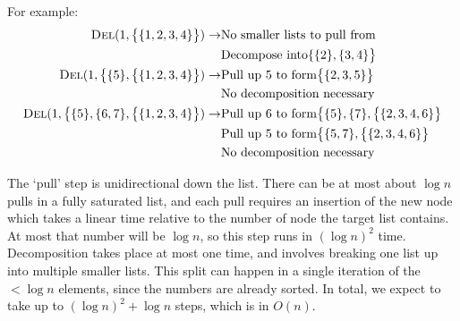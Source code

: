 \documentclass{article}
\begin{document}
\begin{enumerate}
\begin{enumerate}
         For example:
            \begin{equation*}
            \begin{aligned}
                \textsc{Del}(1, \big\{\{1, 2, 3, 4\}\big\}) \rightarrow
                    & \text{No smaller lists to pull from} \\
                    & \text{Decompose into} \{\{2\}, \{3, 4\}\big\} \\
                \textsc{Del}(1, \big\{\{5\}, \big\{\{1, 2, 3, 4\}\big\}) \rightarrow
                    & \text{Pull up 5 to form} \big\{\{2, 3, 5\}\big\} \\
                    & \text{No decomposition necessary} \\
                \textsc{Del}(1, \big\{\{5\}, \{6, 7\}, \big\{\{1, 2, 3, 4\}\big\}) \rightarrow
                    & \text{Pull up 6 to form} \big\{\{5\}, \{7\}, \big\{\{2, 3, 4, 6\}\big\} \\
                    & \text{Pull up 5 to form} \big\{\{5, 7\}, \big\{\{2, 3, 4, 6\}\big\} \\
                    & \text{No decomposition necessary}
            \end{aligned}
            \end{equation*}

        The `pull' step is unidirectional down the list. There can be at most about $\log n$ pulls in a fully saturated list, and each pull requires an insertion of the new node which takes a linear time relative to the number of node the target list contains. At most that number will be $\log n$, so this step runs in $(\log n)^2$ time. Decomposition takes place at most one time, and involves breaking one list up into multiple smaller lists. This split can happen in a single iteration of the $< \log n$ elements, since the numbers are already sorted. In total, we expect to take up to $(\log n)^2 + \log n$ steps, which is in $O(n)$.
    \end{enumerate}
\end{enumerate}
\end{document}
